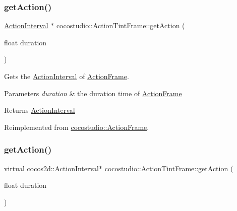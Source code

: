 \subsubsection{\texorpdfstring{get\+Action()}{getAction()}\hspace{0.1cm}{\footnotesize\ttfamily [1/2]}}
{\footnotesize\ttfamily \hyperlink{classActionInterval}{Action\+Interval} $\ast$ cocostudio\+::\+Action\+Tint\+Frame\+::get\+Action (\begin{DoxyParamCaption}\item[{float}]{duration }\end{DoxyParamCaption})\hspace{0.3cm}{\ttfamily [virtual]}}

Gets the \hyperlink{classActionInterval}{Action\+Interval} of \hyperlink{classcocostudio_1_1ActionFrame}{Action\+Frame}.


\begin{DoxyParams}{Parameters}
{\em duration} & the duration time of \hyperlink{classcocostudio_1_1ActionFrame}{Action\+Frame}\\
\hline
\end{DoxyParams}
\begin{DoxyReturn}{Returns}
\hyperlink{classActionInterval}{Action\+Interval} 
\end{DoxyReturn}


Reimplemented from \hyperlink{classcocostudio_1_1ActionFrame_a375216a44f6643d5e771299b1236dc51}{cocostudio\+::\+Action\+Frame}.

\mbox{\label{classcocostudio_1_1ActionTintFrame_a819d36221cd38cabd0a7936871578752}} 
\subsubsection{\texorpdfstring{get\+Action()}{getAction()}\hspace{0.1cm}{\footnotesize\ttfamily [2/2]}}
{\footnotesize\ttfamily virtual cocos2d\+::\+Action\+Interval$\ast$ cocostudio\+::\+Action\+Tint\+Frame\+::get\+Action (\begin{DoxyParamCaption}\item[{float}]{duration }\end{DoxyParamCaption})\hspace{0.3cm}{\ttfamily [virtual]}}

